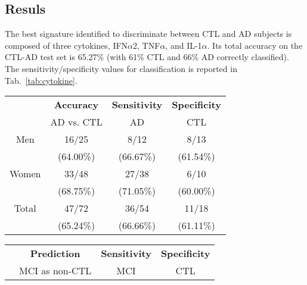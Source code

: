 \documentclass{standalone}
\begin{document}
\subsection[Results]{Resuls}\label{cytokine:cytokine_result}

The best signature identified to discriminate between CTL and AD subjects is composed of three cytokines, IFN$\alpha$2, TNF$\alpha$, and IL-1$\alpha$.
Its total accuracy on the CTL-AD test set is 65.27\% (with 61\% CTL and 66\% AD correctly classified).
The sensitivity/specificity values for classification is reported in Tab.~\ref{tab:cytokine}.

\begin{table}[!htb]
  \begin{minipage}{.5\linewidth}
    \hspace{-1.5cm}
      \begin{tabular}{cccc}
          \hline \rowcolor{darkgrayrow}
                      &  \textbf{Accuracy}  &  \textbf{Sensitivity}  &  \textbf{Specificity} \\
                      &  AD vs. CTL         &  AD                    &    CTL                \\
          \hline
              Men     &    16/25            &    8/12                &    8/13               \\
                      &          (64.00\%)  &         (66.67\%)      &         (61.54\%)     \\
              Women   &    33/48            &   27/38                &    6/10               \\
                      &          (68.75\%)  &         (71.05\%)      &         (60.00\%)     \\
              Total   &    47/72            &   36/54                &   11/18               \\
                      &          (65.24\%)  &         (66.66\%)      &         (61.11\%)     \\
          \hline
      \end{tabular}
  \end{minipage}%
  \begin{minipage}{.5\linewidth}
    \centering
      \begin{tabular}{cccc}
          \hline \rowcolor{darkgrayrow}
                      & \textbf{Prediction} &  \textbf{Sensitivity}  &  \textbf{Specificity} \\
                      &  MCI as non-CTL     &  MCI                   &    CTL                \\

\end{tabular}
\end{minipage}
\end{table}
\end{document}
